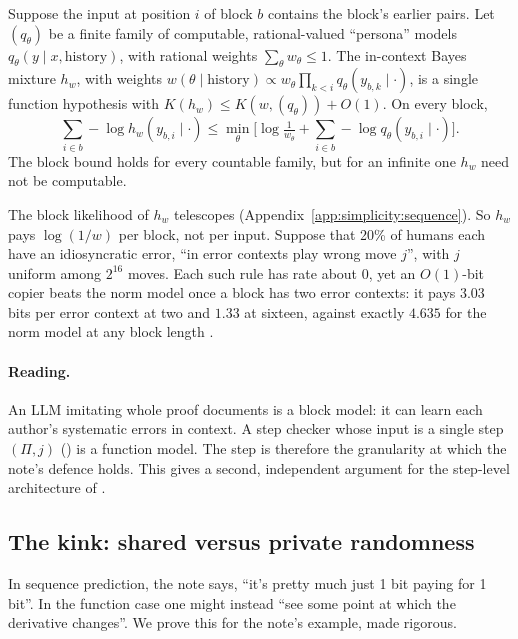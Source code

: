 \begin{proposition}\label{prop:simplicity:block}
Suppose the input at position $i$ of block $b$ contains the block's earlier pairs. Let $(q_\theta)$ be a finite family of computable, rational-valued ``persona'' models $q_\theta(y\mid x,\text{history})$, with rational weights $\sum_\theta w_\theta\le1$. The in-context Bayes mixture $h_w$, with weights $w(\theta\mid\text{history})\propto w_\theta\prod_{k<i}q_\theta(y_{b,k}\mid\cdot)$, is a single function hypothesis with $K(h_w)\le K(w,(q_\theta))+O(1)$. On every block,
\[
\sum_{i\in b}-\log h_w(y_{b,i}\mid\cdot)\le\min_\theta\Big[\log\tfrac1{w_\theta}+\sum_{i\in b}-\log q_\theta(y_{b,i}\mid\cdot)\Big].
\]
The block bound holds for every countable family, but for an infinite one $h_w$ need not be computable.
\end{proposition}

The block likelihood of $h_w$ telescopes (Appendix~\ref{app:simplicity:sequence}). So $h_w$ pays $\log(1/w)$ per block, not per input. Suppose that 20\% of humans each have an idiosyncratic error, ``in error contexts play wrong move $j$'', with $j$ uniform among $2^{16}$ moves. Each such rule has rate about $0$, yet an $O(1)$-bit copier beats the norm model once a block has two error contexts: it pays $3.03$ bits per error context at two and $1.33$ at sixteen, against exactly $4.635$ for the norm model at any block length .

\paragraph{Reading.} An LLM imitating whole proof documents is a block model: it can learn each author's systematic errors in context. A step checker whose input is a single step $(\Pi,j)$ () is a function model. The step is therefore the granularity at which the note's defence holds. This gives a second, independent argument for the step-level architecture of .

\subsection{The kink: shared versus private randomness}\label{sec:simplicity:kink}

In sequence prediction, the note says, ``it's pretty much just 1 bit paying for 1 bit''. In the function case one might instead ``see some point at which the derivative changes''. We prove this for the note's example, made rigorous.

